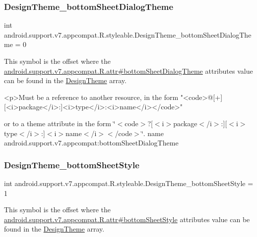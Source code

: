 \subsubsection{\texorpdfstring{Design\+Theme\+\_\+bottom\+Sheet\+Dialog\+Theme}{DesignTheme\_bottomSheetDialogTheme}}
{\footnotesize\ttfamily int android.\+support.\+v7.\+appcompat.\+R.\+styleable.\+Design\+Theme\+\_\+bottom\+Sheet\+Dialog\+Theme = 0\hspace{0.3cm}{\ttfamily [static]}}

This symbol is the offset where the \hyperlink{classandroid_1_1support_1_1v7_1_1appcompat_1_1R_1_1attr_a3fee06f2eb3a9ae15a03adaeda42147b}{android.\+support.\+v7.\+appcompat.\+R.\+attr\#bottom\+Sheet\+Dialog\+Theme} attribute\textquotesingle{}s value can be found in the \hyperlink{classandroid_1_1support_1_1v7_1_1appcompat_1_1R_1_1styleable_aff3ce11bdf266828d90b9a386168c4b0}{Design\+Theme} array.

\begin{DoxyVerb}      <p>Must be a reference to another resource, in the form "<code>@[+][<i>package</i>:]<i>type</i>:<i>name</i></code>"
\end{DoxyVerb}
 or to a theme attribute in the form \char`\"{}$<$code$>$?\mbox{[}$<$i$>$package$<$/i$>$\+:\mbox{]}\mbox{[}$<$i$>$type$<$/i$>$\+:\mbox{]}$<$i$>$name$<$/i$>$$<$/code$>$\char`\"{}.  name android.\+support.\+v7.\+appcompat\+:bottom\+Sheet\+Dialog\+Theme \mbox{\label{classandroid_1_1support_1_1v7_1_1appcompat_1_1R_1_1styleable_a31ceb2d562b5ab39daae25884437ad4c}} 
\subsubsection{\texorpdfstring{Design\+Theme\+\_\+bottom\+Sheet\+Style}{DesignTheme\_bottomSheetStyle}}
{\footnotesize\ttfamily int android.\+support.\+v7.\+appcompat.\+R.\+styleable.\+Design\+Theme\+\_\+bottom\+Sheet\+Style = 1\hspace{0.3cm}{\ttfamily [static]}}

This symbol is the offset where the \hyperlink{classandroid_1_1support_1_1v7_1_1appcompat_1_1R_1_1attr_a4ac92cbe973891bb7a82263ec54fdd6e}{android.\+support.\+v7.\+appcompat.\+R.\+attr\#bottom\+Sheet\+Style} attribute\textquotesingle{}s value can be found in the \hyperlink{classandroid_1_1support_1_1v7_1_1appcompat_1_1R_1_1styleable_aff3ce11bdf266828d90b9a386168c4b0}{Design\+Theme} array.

